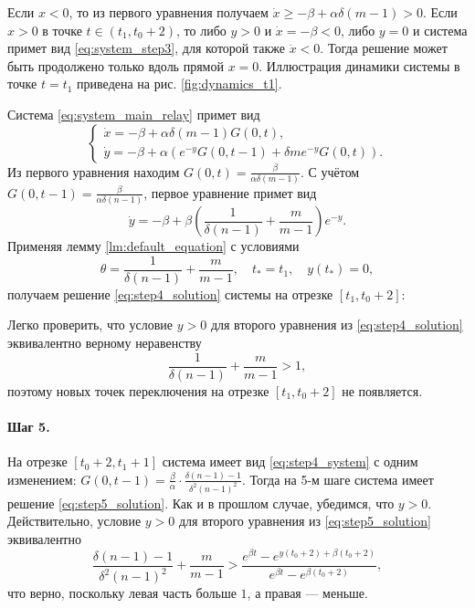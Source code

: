 Если $x < 0$, то из первого уравнения получаем $\dot{x} \geqslant -\beta + \alpha \delta (m - 1) > 0$. Если $x > 0$ в точке $t \in (t_1, t_0 + 2)$, то либо $y > 0$ и $\dot{x} = -\beta < 0$, либо $y = 0$ и система примет вид \eqref{eq:system_step3}, для которой также $\dot{x} < 0$. Тогда решение может быть продолжено только вдоль прямой $x = 0$. Иллюстрация динамики системы в точке $t=t_1$ приведена на рис. \ref{fig:dynamics_t1}.

Система \eqref{eq:system_main_relay} примет вид
%
\begin{equation}
	\label{eq:step4_system}
	\begin{cases}
		\dot{x} = -\beta + \alpha \delta (m - 1) G(0, t),\\
		\dot{y} = -\beta + \alpha \left(e^{-y} G(0, t - 1) + \delta m e^{-y} G(0, t)\right).
	\end{cases}
\end{equation}
%
Из первого уравнения находим $G(0, t) = \frac{\beta}{\alpha \delta (m - 1)}$. С учётом $G(0, t - 1) = \frac{\beta}{\alpha \delta (n - 1)}$, первое уравнение примет вид
\[
\dot{y} = -\beta + \beta \left(\dfrac{1}{\delta(n - 1)} + \dfrac{m}{m - 1} \right) e^{-y}.
\]
%
Применяя лемму \ref{lm:default_equation} с условиями
\[
\theta = \dfrac{1}{\delta(n - 1)} + \dfrac{m}{m - 1}, \quad t_* = t_1, \quad y(t_*) = 0,
\]
получаем решение \eqref{eq:step4_solution} системы на отрезке $[t_1, t_0 + 2]$:

Легко проверить, что условие $y > 0$ для второго уравнения из \eqref{eq:step4_solution} эквивалентно верному неравенству
\[
\dfrac{1}{\delta(n - 1)} + \dfrac{m}{m - 1} > 1,
\]
поэтому новых точек переключения на отрезке $[t_1, t_0 + 2]$ не появляется.

\paragraph{Шаг 5.} На отрезке $[t_0 + 2, t_1 + 1]$ система имеет вид \eqref{eq:step4_system} с одним изменением: $G(0, t - 1) = \frac{\beta}{\alpha} \cdot \frac{\delta(n - 1) - 1}{\delta^2 (n - 1)^2}$.
%
Тогда на 5-м шаге система имеет решение \eqref{eq:step5_solution}.
%
Как и в прошлом случае, убедимся, что $y > 0$. Действительно, условие $y > 0$ для второго уравнения из \eqref{eq:step5_solution} эквивалентно
\[
\frac{\delta(n - 1) - 1}{\delta^2 (n - 1)^2} + \dfrac{m}{m - 1} > \dfrac{e^{\beta t} - e^{y(t_0 + 2) + \beta (t_0 + 2)}}{e^{\beta t} - e^{\beta (t_0 + 2)}},
\]
что верно, поскольку левая часть больше $1$, а правая --- меньше.


